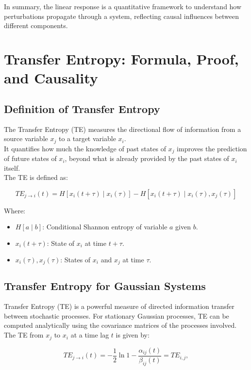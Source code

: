 \documentclass[English, Lau, oneside]{sapthesis}
\begin{document}
In summary, the linear response is a quantitative framework to understand how perturbations propagate through a system, reflecting causal influences between different components.
\newpage
\section*{Transfer Entropy: Formula, Proof, and Causality}

\subsection*{Definition of Transfer Entropy}
\noindent The Transfer Entropy (TE) measures the directional flow of information from a source variable \(x_j\) to a target variable \(x_i\).\\
It quantifies how much the knowledge of past states of \(x_j\) improves the prediction of future states of \(x_i\), beyond what is already provided by the past states of \(x_i\) itself. \\
The TE is defined as:\cite{ref13}

\[
TE_{j \to i}(t) = H[x_i(t + \tau) \mid x_i(\tau)] - H[x_i(t + \tau) \mid x_i(\tau), x_j(\tau)]
\]

Where:
\begin{itemize}
    \item \(H[a \mid b]\): Conditional Shannon entropy of variable \(a\) given \(b\).
    \item \(x_i(t + \tau)\): State of \(x_i\) at time \(t + \tau\).
    \item \(x_i(\tau), x_j(\tau)\): States of \(x_i\) and \(x_j\) at time \(\tau\).
\end{itemize}

\subsection*{Transfer Entropy for Gaussian Systems}

\noindent Transfer Entropy (TE) is a powerful measure of directed information transfer between stochastic processes. For stationary Gaussian processes, TE can be computed analytically using the covariance matrices of the processes involved. The TE from \(x_j\) to \(x_i\) at a time lag \(t\) is given by:\cite{ref13}



\begin{equation}
TE_{j \to i}(t) = -\frac{1}{2} \ln{1 - \frac{\alpha_{ij}(t)}{\beta_{ij}(t)}}=TE_{i,j},\label{TE}
\end{equation}
\end{document}
